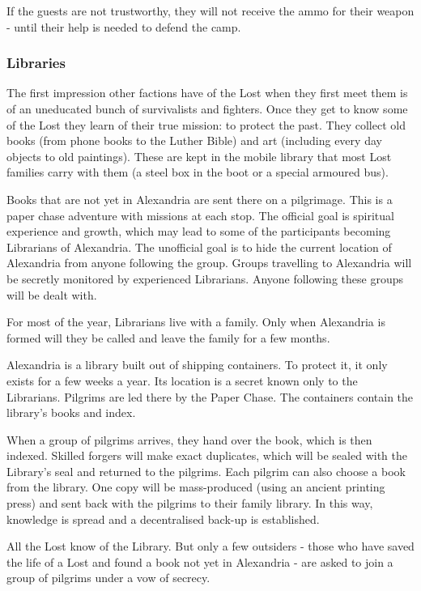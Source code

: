 If the guests are not trustworthy, they will not receive the ammo for their weapon - until their help is needed to defend the camp.

\subsubsection{Libraries}

The first impression other factions have of the Lost when they first meet them is of an uneducated bunch of survivalists and fighters. Once they get to know some of the Lost they learn of their true mission: to protect the past. They collect old books (from phone books to the Luther Bible) and art (including every day objects to old paintings).
These are kept in the mobile library that most Lost families carry with them (a steel box in the boot or a special armoured bus).

Books that are not yet in Alexandria are sent there on a pilgrimage. This is a paper chase adventure with missions at each stop. The official goal is spiritual experience and growth, which may lead to some of the participants becoming Librarians of Alexandria. The unofficial goal is to hide the current location of Alexandria from anyone following the group.
Groups travelling to Alexandria will be secretly monitored by experienced Librarians. Anyone following these groups will be dealt with.

For most of the year, Librarians live with a family. Only when Alexandria is formed will they be called and leave the family for a few months.

Alexandria is a library built out of shipping containers. To protect it, it only exists for a few weeks a year. Its location is a secret known only to the Librarians. Pilgrims are led there by the Paper Chase. The containers contain the library's books and index.

When a group of pilgrims arrives, they hand over the book, which is then indexed. Skilled forgers will make exact duplicates, which will be sealed with the Library's seal and returned to the pilgrims. Each pilgrim can also choose a book from the library. One copy will be mass-produced (using an ancient printing press) and sent back with the pilgrims to their family library.
In this way, knowledge is spread and a decentralised back-up is established.

All the Lost know of the Library. But only a few outsiders - those who have saved the life of a Lost and found a book not yet in Alexandria - are asked to join a group of pilgrims under a vow of secrecy.

